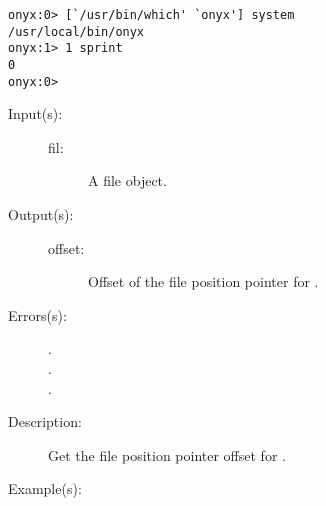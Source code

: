 \begin{description}
\begin{description}
\begin{verbatim}
onyx:0> [`/usr/bin/which' `onyx'] system
/usr/local/bin/onyx
onyx:1> 1 sprint
0
onyx:0>
		\end{verbatim}
	\end{description}
\label{systemdict:tell}
\item[{\onyxop{file}{tell}{offset}}: ]
	\begin{description}\item[]
	\item[Input(s): ]
		\begin{description}\item[]
		\item[fil: ]
			A file object.
		\end{description}
	\item[Output(s): ]
		\begin{description}\item[]
		\item[offset: ]
			Offset of the file position pointer for .
		\end{description}
	\item[Errors(s): ]
		\begin{description}\item[]
		\item[.]
		\item[.]
		\item[.]
		\end{description}
	\item[Description: ]
		Get the file position pointer offset for .
	\item[Example(s): ]\begin{verbatim}


\end{verbatim}
\end{description}
\end{description}
